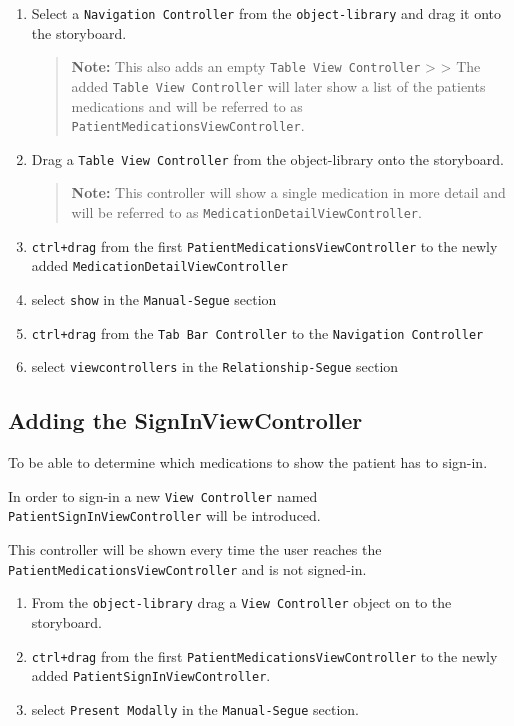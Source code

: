 \documentclass{article}
\begin{document}
\begin{enumerate}
\def\labelenumi{\arabic{enumi}.}
\item
  Select a \texttt{Navigation\ Controller} from the
  \texttt{object-library} and drag it onto the storyboard.
  \begin{quote}
    \textbf{Note:} This also adds an empty
    \texttt{Table\ View\ Controller} \textgreater{} \textgreater{} The
    added \texttt{Table\ View\ Controller} will later show a list of the
    patients medications and will be referred to as
    \texttt{PatientMedicationsViewController}.
  \end{quote}
\item
  Drag a \texttt{Table\ View\ Controller} from the object-library onto
  the storyboard.

  \begin{quote}
    \textbf{Note:} This controller will show
    a single medication in more detail and will be referred to as
    \texttt{MedicationDetailViewController}.
  \end{quote}
\item
  \texttt{ctrl+drag} from the first
  \texttt{PatientMedicationsViewController} to the newly added
  \texttt{MedicationDetailViewController}
\item
  select \texttt{show} in the \texttt{Manual-Segue} section
\item
  \texttt{ctrl+drag} from the \texttt{Tab\ Bar\ Controller} to the
  \texttt{Navigation\ Controller}
\item
  select \texttt{viewcontrollers} in the \texttt{Relationship-Segue}
  section
\end{enumerate}

\subsection{Adding the SignInViewController}\label{adding-the-signinviewcontroller}
To be able to determine which medications to show the patient has to
sign-in.

In order to sign-in a new \texttt{View\ Controller} named
\texttt{PatientSignInViewController} will be introduced.

This controller will be shown every time the user reaches the
\texttt{PatientMedicationsViewController} and is not signed-in.

\begin{enumerate}
\def\labelenumi{\arabic{enumi}.}
\item
  From the \texttt{object-library} drag a \texttt{View\ Controller}
  object on to the storyboard.
\item
  \texttt{ctrl+drag} from the first
  \texttt{PatientMedicationsViewController} to the newly added
  \texttt{PatientSignInViewController}.
\item
  select \texttt{Present\ Modally} in the \texttt{Manual-Segue} section.
\end{enumerate}
\end{document}
